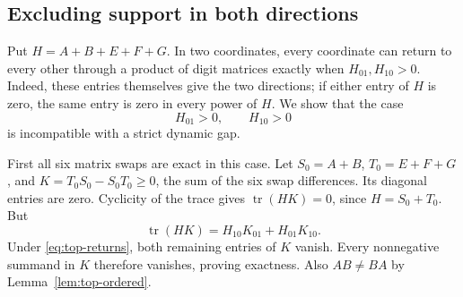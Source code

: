 \documentclass[11pt,a4paper]{article}
\newcommand{\tr}{\operatorname{tr}}
\begin{document}
\subsection{Excluding support in both directions}

Put $H=A+B+E+F+G$. In two coordinates, every coordinate can return
to every other through a product of digit matrices exactly when
$H_{01},H_{10}>0$. Indeed, these entries themselves give the two
directions; if either entry of $H$ is zero, the same entry is zero
in every power of $H$. We show that the case
\begin{equation}\label{eq:top-returns}
H_{01}>0,\qquad H_{10}>0
\end{equation}
is incompatible with a strict dynamic gap.

First all six matrix swaps are exact in this case. Let
$S_0=A+B$, $T_0=E+F+G$, and
$K=T_0S_0-S_0T_0\ge0$, the sum of the six swap differences.
Its diagonal entries are zero. Cyclicity of the trace gives
$\tr(HK)=0$, since $H=S_0+T_0$. But
\[
\tr(HK)=H_{10}K_{01}+H_{01}K_{10}.
\]
Under \eqref{eq:top-returns}, both remaining entries of $K$ vanish.
Every nonnegative summand in $K$ therefore vanishes, proving exactness.
Also $AB\ne BA$ by Lemma~\ref{lem:top-ordered}.
\end{document}
